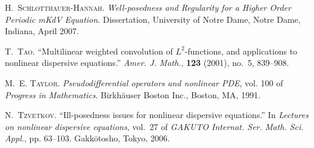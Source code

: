 \documentclass[12pt,reqno]{amsart}
\theoremstyle{plain}  %
\begin{document}
\begin{thebibliography}{10}
\textsc{H.~Schlotthauer-Hannah}.
\newblock \emph{Well-posedness and Regularity for a Higher Order Periodic mKdV
  Equation}.
\newblock Dissertation, University of Notre Dame, Notre Dame, Indiana, April
  2007.

\textsc{T.~Tao}.
\newblock \enquote{Multilinear weighted convolution of {$L^2$}-functions, and
  applications to nonlinear dispersive equations.}
\newblock \emph{Amer. J. Math.}, \textbf{123} (2001), no.~5, 839--908.

\textsc{M.~E. Taylor}.
\newblock \emph{Pseudodifferential operators and nonlinear {PDE}}, vol. 100 of
  \emph{Progress in Mathematics}.
\newblock Birkh{\"a}user Boston Inc., Boston, MA, 1991.

\textsc{N.~Tzvetkov}.
\newblock \enquote{Ill-posedness issues for nonlinear dispersive equations.}
\newblock In \emph{Lectures on nonlinear dispersive equations}, vol.~27 of
  \emph{GAKUTO Internat. Ser. Math. Sci. Appl.}, pp. 63--103. Gakk\=otosho,
  Tokyo, 2006.

\end{thebibliography}
				  
\end{document}
